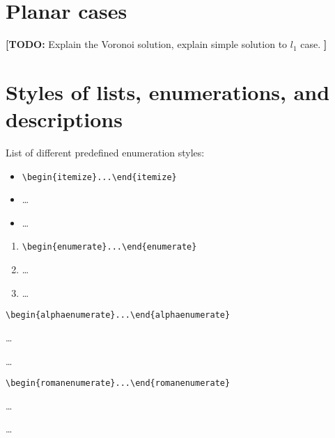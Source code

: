 \documentclass[a4paper,UKenglish,cleveref, autoref, thm-restate]{lipics-v2021}
\newcommand{\nota}[3]{{%
		\color{#2}
		\marginpar{\color{#2!75!black}\textbf\texttimes}%
		\textsf{\textbf{[\textbullet#1:}
			\textsf{\small#3}
			\textbf{\textbullet]}}%
}}
\newcommand{\todo}[1]{\nota{TODO}{red!55!black}{#1}}
\begin{document}
\section*{Planar cases}
\todo{Explain the Voronoi solution, explain simple solution to $l_1$ case.}





\appendix

\section{Styles of lists, enumerations, and descriptions}\label{sec:itemStyles}

List of different predefined enumeration styles:

\begin{itemize}
\item \verb|\begin{itemize}...\end{itemize}|
\item \dots
\item \dots
\end{itemize}

\begin{enumerate}
\item \verb|\begin{enumerate}...\end{enumerate}|
\item \dots
\item \dots
\end{enumerate}

\begin{alphaenumerate}
\item \verb|\begin{alphaenumerate}...\end{alphaenumerate}|
\item \dots
\item \dots
\end{alphaenumerate}

\begin{romanenumerate}
\item \verb|\begin{romanenumerate}...\end{romanenumerate}|
\item \dots
\item \dots
\end{romanenumerate}
\end{document}
